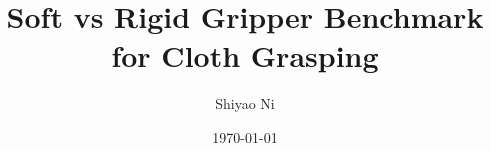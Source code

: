 \documentclass[12pt,oneside]{book}
\title{Soft vs Rigid Gripper Benchmark for Cloth Grasping}
\author{Shiyao Ni}
\date{\today}
\begin{document}
\newcommand{\mcgillguidelines}{\href{https://www.mcgill.ca/gps/thesis/thesis-guidelines/preparation}{Official McGill Guidelines: }}


\begin{onehalfspacing}
\pagestyle{empty}

\cleardoublepage
\end{onehalfspacing}


\pagestyle{plain}
\onehalfspacing



\clearpage

\cleardoublepage



\clearpage


\clearpage

\tableofcontents
\listoffigures
\listoftables
\clearpage


\clearpage

\clearpage

\clearpage



\graphicspath{{images/}}










\appendix

\clearpage






\end{document}
